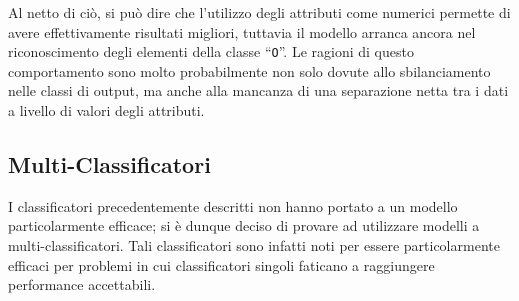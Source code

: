 Al netto di ciò, si può dire che l'utilizzo degli attributi come numerici permette di avere effettivamente risultati migliori,
tuttavia il modello arranca ancora nel riconoscimento degli elementi della classe ``\texttt{O}''.
Le ragioni di questo comportamento sono molto probabilmente non solo dovute allo sbilanciamento nelle classi di output,
ma anche alla mancanza di una separazione netta tra i dati a livello di valori degli attributi.




\subsection{Multi-Classificatori}

I classificatori precedentemente descritti non hanno portato a un modello particolarmente efficace;
si è dunque deciso di provare ad utilizzare modelli a multi-classificatori.
Tali classificatori sono infatti noti per essere particolarmente efficaci per problemi in cui classificatori singoli faticano a raggiungere performance accettabili.

